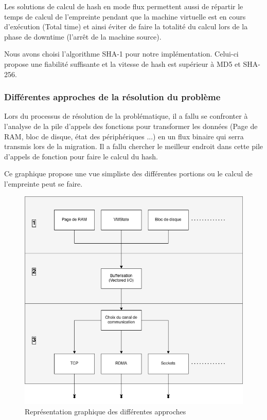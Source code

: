 Les solutions de calcul de hash en mode flux permettent aussi de répartir le temps de calcul de l'empreinte pendant que la machine virtuelle est en cours d’exécution (Total time) et ainsi éviter de faire la totalité du calcul lors de la phase de downtime (l'arrêt de la machine source).

Nous avons choisi l'algorithme SHA-1 pour notre implémentation. 
Celui-ci propose une fiabilité suffisante et la vitesse de hash est supérieur à MD5 et SHA-256.

\subsubsection{Différentes approches de la résolution du problème}
Lors du processus de résolution de la problématique, il a fallu se confronter à l'analyse de la pile d'appels des fonctions pour transformer les données (Page de RAM, bloc de disque, état des périphériques ...) en un flux binaire qui serra transmis lors de la migration.
Il a fallu chercher le meilleur endroit dans cette pile d'appels de fonction pour faire le calcul du hash.\cite{usecase}

Ce graphique propose une vue simpliste des différentes portions ou le calcul de l'empreinte peut se faire.
\begin{figure}[H]
\centering
\includegraphics[scale=0.5]{include/placement.png}
\caption{Représentation graphique des différentes approches}
\end{figure}



